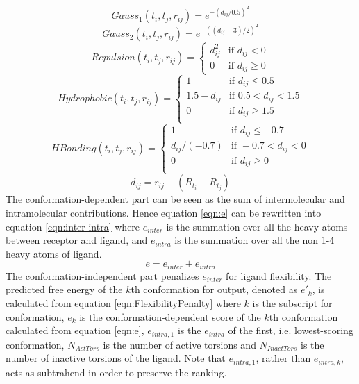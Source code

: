 \documentclass[10pt]{article}
\begin{document}
\begin{equation}
\label{eqn:Gauss1}
Gauss_1(t_i, t_j, r_{ij}) = e^{-(d_{ij} / 0.5)^2}
\end{equation}
\begin{equation}
\label{eqn:Gauss2}
Gauss_2(t_i, t_j, r_{ij}) = e^{-((d_{ij} - 3) / 2)^2}
\end{equation}
\begin{equation}
\label{eqn:Repulsion}
Repulsion(t_i, t_j, r_{ij}) =
\begin{cases}
d_{ij}^2 & \text{if } d_{ij} < 0\\
0 &\text{if } d_{ij} \geq 0
\end{cases}
\end{equation}
\begin{equation}
\label{eqn:Hydrophobic}
Hydrophobic(t_i, t_j, r_{ij}) =
\begin{cases}
1 & \text{if } d_{ij} \leq 0.5\\
1.5 - d_{ij} & \text{if } 0.5 < d_{ij} < 1.5\\
0 & \text{if } d_{ij} \geq 1.5\\
\end{cases}
\end{equation}
\begin{equation}
\label{eqn:HBonding}
HBonding(t_i, t_j, r_{ij}) =
\begin{cases}
1 & \text{if } d_{ij} \leq -0.7\\
d_{ij} / (-0.7) & \text{if } -0.7 < d_{ij} < 0\\
0 & \text{if } d_{ij} \geq 0\\
\end{cases}
\end{equation}
\begin{equation}
\label{eqn:dij}
d_{ij} = r_{ij} - (R_{t_i} + R_{t_j})
\end{equation}
The conformation-dependent part can be seen as the sum of intermolecular and intramolecular contributions. Hence equation \eqref{eqn:e} can be rewritten into equation \eqref{eqn:inter-intra} where $e_{inter}$ is the summation over all the heavy atoms between receptor and ligand, and $e_{intra}$ is the summation over all the non 1-4 heavy atoms of ligand.
\begin{equation}
\label{eqn:inter-intra}
e = e_{inter} + e_{intra}
\end{equation}
The conformation-independent part penalizes $e_{inter}$ for ligand flexibility. The predicted free energy of the $k$th conformation for output, denoted as $e'_k$, is calculated from equation \eqref{eqn:FlexibilityPenalty} where $k$ is the subscript for conformation, $e_k$ is the conformation-dependent score of the $k$th conformation calculated from equation \eqref{eqn:e}, $e_{intra,1}$ is the $e_{intra}$ of the first, i.e. lowest-scoring conformation, $N_{ActTors}$ is the number of active torsions and $N_{InactTors}$ is the number of inactive torsions of the ligand. Note that $e_{intra,1}$, rather than $e_{intra,k}$, acts as subtrahend in order to preserve the ranking.
\end{document}

